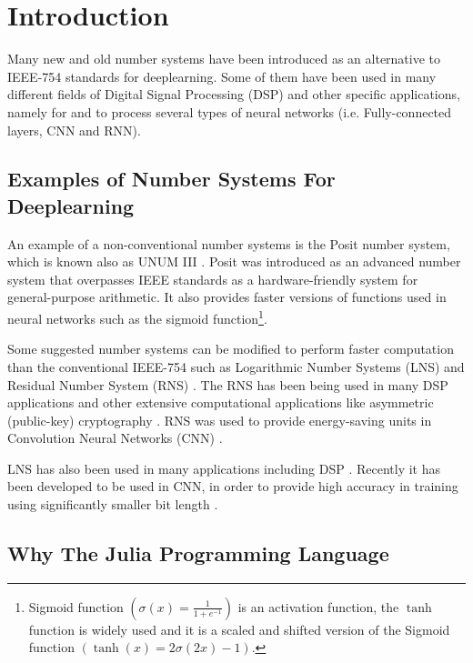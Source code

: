 \section{Introduction}

Many new and old number systems have been introduced as an alternative to IEEE-754 standards \cite{754} for deeplearning. Some of them have been used in many different fields of Digital Signal Processing (DSP) and other specific applications, namely for and to process several types of neural networks (i.e. Fully-connected layers, CNN and RNN).

\subsection{Examples of Number Systems For Deeplearning}

An example of a non-conventional number systems is the Posit number system, which is known also as UNUM III \cite{Gustafson2017}. Posit was introduced as an advanced number system that overpasses IEEE standards as a hardware-friendly system for general-purpose arithmetic. It also provides faster versions of functions used in neural networks such as the sigmoid function\footnote{Sigmoid function $\left(\sigma(x) = \frac{1}{1 + e^{-1}}\right)$ is an activation function, the $\tanh$ function is widely used and it is a scaled and shifted version of the Sigmoid function $\left(\tanh(x) = 2 \sigma(2x) -1\right)$.}.

Some suggested number systems can be modified to perform faster computation than the conventional IEEE-754 such as Logarithmic Number Systems (LNS) \cite{Kingsbury1971} and Residual Number System (RNS) \cite{Garner1959}. The RNS has been being used in many DSP applications \cite{Cardarilli2007,Chaves2003,Claudio1995,DiClaudio1990,Jullien1987} and other extensive computational applications like asymmetric (public-key) cryptography \cite{Sousa2016}. RNS was used to provide energy-saving units in Convolution Neural Networks (CNN) \cite{Samimi2020}.

LNS \cite{Kingsbury1971,Alexopoulos1975,Lee1977} has also been used in many applications including DSP \cite{Dimitrov2001,Lewis1995}. Recently it has been developed to be used in CNN, in order to provide high accuracy in training using significantly smaller bit length \cite{Miyashita2016,Juang2019}.

\subsection{Why The Julia Programming Language}

